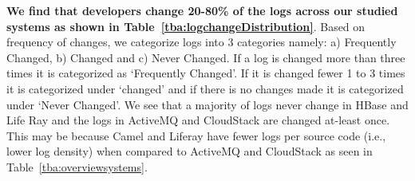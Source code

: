 \textbf{We find that developers change 20-80\% of the logs across our studied systems as shown in Table~\ref{tba:logchangeDistribution}}. Based on frequency of changes, we categorize logs into 3 categories namely: a) Frequently Changed, b) Changed and c) Never Changed. If a log is changed more than three times it is categorized as `Frequently Changed'. If it is changed fewer 1 to 3 times it is categorized under `changed' and if there is no changes made it is categorized under `Never Changed'. We see that a majority of logs never change in HBase and Life Ray and the logs in ActiveMQ and CloudStack are changed at-least once. This may be because Camel and Liferay have fewer logs per source code (i.e., lower log density) when compared to ActiveMQ and CloudStack as seen in Table~\ref{tba:overviewsystems}. 



